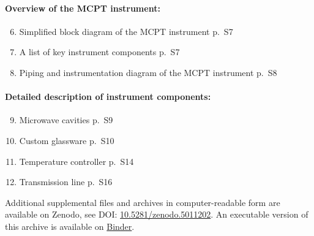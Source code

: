 \documentclass[12pt]{article}
\begin{document}
\paragraph{Overview of the MCPT instrument:}
\begin{enumerate}
    \setcounter{enumi}{5}
    \item Simplified block diagram of the MCPT instrument \hfill p.~S7
    \item A list of key instrument components \hfill p.~S7
    \item Piping and instrumentation diagram of the MCPT instrument \hfill p.~S8
\end{enumerate}

\paragraph{Detailed description of instrument components:}
\begin{enumerate}
    \setcounter{enumi}{8}
	\item Microwave cavities \hfill p.~S9
	\item Custom glassware \hfill p.~S10
	\item Temperature controller \hfill p.~S14
    \item Transmission line \hfill p.~S16
\end{enumerate}

Additional supplemental files and archives in computer-readable form are available on Zenodo, see DOI: \href{https://doi.org/10.5281/zenodo.5011202}{10.5281/zenodo.5011202}. An executable version of this archive is available on \href{https://mybinder.org/v2/zenodo/10.5281/zenodo.5011202/?filepath=index.ipynb}{Binder}.
\end{document}
